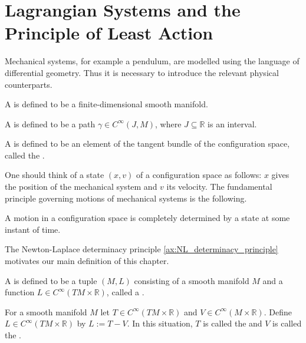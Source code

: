 \section*{Lagrangian Systems and the Principle of Least Action}
Mechanical systems, for example a pendulum, are modelled using the language of differential geometry. Thus it is necessary to introduce the relevant physical counterparts. 

\begin{definition}
	A  is defined to be a finite-dimensional smooth manifold.
\end{definition}

\begin{definition}[Motion]
	A  is defined to be a path $\gamma \in C^\infty(J, M)$, where $J \subseteq \mathbb{R}$ is an interval.
\end{definition}

\begin{definition}[State]
	A  is defined to be an element of the tangent bundle of the configuration space, called the .
\end{definition}

One should think of a state $(x,v)$ of a configuration space as follows: $x$ gives the position of the mechanical system and $v$ its velocity. The fundamental principle governing motions of mechanical systems is the following.

\begin{axiom}
	\label{ax:NL_determinacy_principle}
	A motion in a configuration space is completely determined by a state at some instant of time.
\end{axiom}

The Newton-Laplace determinacy principle \ref{ax:NL_determinacy_principle} motivates our main definition of this chapter.

\begin{definition}
	\label{def:Lagrangian_system}
	A  is defined to be a tuple $(M,L)$ consisting of a smooth manifold $M$ and a function $L \in C^\infty(TM \times \mathbb{R})$, called a .
\end{definition}

\begin{example}
	\label{ex:Lagrangian}
	For a smooth manifold $M$ let $T \in C^\infty(TM \times \mathbb{R})$ and $V \in C^\infty(M \times \mathbb{R})$. Define $L \in C^\infty(TM \times \mathbb{R})$ by $L := T - V$. In this situation, $T$ is called the  and $V$ is called the .
\end{example}


